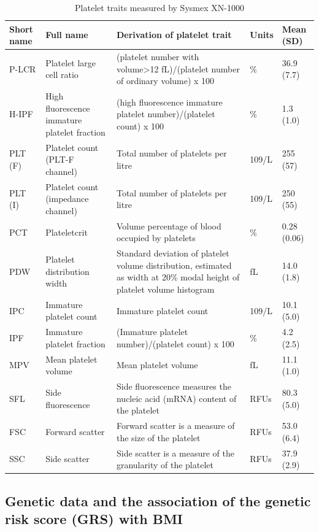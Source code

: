\documentclass[11pt,twoside]{bristolthesis}
\begin{document}
\begin{landscape}\begin{table}

\caption[Platelet traits measured by Sysmex XN-1000]{\label{tab:Platelet-traits}Platelet traits measured by Sysmex XN-1000}
\centering
\begin{tabu} to 
\toprule
Short name & Full name & Derivation of platelet trait & Units & Mean (SD)\\
\midrule
P-LCR & Platelet large cell ratio & (platelet number with volume>12 fL)/(platelet number of ordinary volume)  x 100 & \% & 36.9 (7.7)\\
H-IPF & High fluorescence immature platelet fraction & (high fluorescence immature platelet number)/(platelet count)  x 100 & \% & 1.3 (1.0)\\
PLT (F) & Platelet count (PLT-F channel) & Total number of platelets per litre & 109/L & 255 (57)\\
PLT (I) & Platelet count (impedance channel) & Total number of platelets per litre & 109/L & 250 (55)\\
PCT & Plateletcrit & Volume percentage of blood occupied by platelets & \% & 0.28 (0.06)\\
\addlinespace
PDW & Platelet distribution width & Standard deviation of platelet volume distribution, estimated as width at 20\% modal height of platelet volume histogram & fL & 14.0 (1.8)\\
IPC & Immature platelet count & Immature platelet count & 109/L & 10.1 (5.0)\\
IPF & Immature platelet fraction & (Immature platelet number)/(platelet count)   x 100 & \% & 4.2 (2.5)\\
MPV & Mean platelet volume & Mean platelet volume & fL & 11.1 (1.0)\\
SFL & Side fluorescence & Side fluorescence measures the nucleic acid (mRNA) content of the platelet & RFUs & 80.3 (5.0)\\
\addlinespace
FSC & Forward scatter & Forward scatter is a measure of the size of the platelet & RFUs & 53.0 (6.4)\\
SSC & Side scatter & Side scatter is a measure of the granularity of the platelet & RFUs & 37.9 (2.9)\\
\bottomrule
\end{tabu}
\end{table}
\end{landscape}
\hypertarget{genetic-data-and-the-association-of-the-genetic-risk-score-grs-with-bmi}{%
\subsection{Genetic data and the association of the genetic risk score (GRS) with BMI}\label{genetic-data-and-the-association-of-the-genetic-risk-score-grs-with-bmi}}
\end{document}
